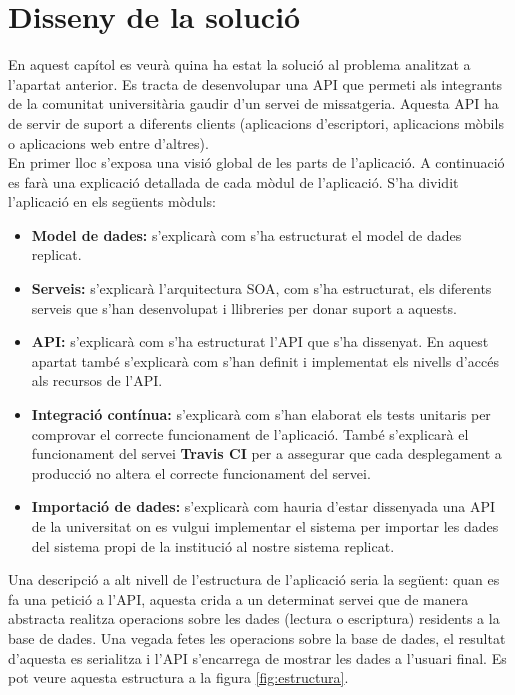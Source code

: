 \chapter{Disseny de la solució}\label{disseny}
En aquest capítol es veurà quina ha estat la solució al problema analitzat a l'apartat anterior. Es tracta de desenvolupar una \ac{API} que permeti als integrants de la comunitat universitària gaudir d'un servei de missatgeria. Aquesta \ac{API} ha de servir de suport a diferents clients (aplicacions d'escriptori, aplicacions mòbils o aplicacions web entre d'altres). \\

En primer lloc s'exposa una visió global de les parts de l'aplicació. A continuació es farà una explicació detallada de cada mòdul de l'aplicació. S'ha dividit l'aplicació en els següents mòduls: 
\begin{itemize}

	\item \textbf{Model de dades:} s'explicarà com s'ha estructurat el model de dades replicat.
	
	\item \textbf{Serveis:} s'explicarà l'arquitectura \ac{SOA}, com s'ha estructurat, els diferents serveis que s'han desenvolupat i llibreries per donar suport a aquests.
	
	\item \textbf{\ac{API}:} s'explicarà com s'ha estructurat l'\ac{API} que s'ha dissenyat. En aquest apartat també s'explicarà com s'han definit i implementat els nivells d'accés als recursos de l'\ac{API}.
	
	\item \textbf{Integració contínua:} s'explicarà com s'han elaborat els tests unitaris per comprovar el correcte funcionament de l'aplicació. També s'explicarà el funcionament del servei \textbf{Travis CI} per a assegurar que cada desplegament a producció no altera el correcte funcionament del servei.
	
	\item \textbf{Importació de dades:} s'explicarà com hauria d'estar dissenyada una \ac{API} de la universitat on es vulgui implementar el sistema per importar les dades del sistema propi de la institució al nostre sistema replicat.
	
\end{itemize}

Una descripció a alt nivell de l'estructura de l'aplicació seria la següent: quan es fa una petició a l'\ac{API}, aquesta crida a un determinat servei que de manera abstracta realitza operacions sobre les dades (lectura o escriptura) residents a la base de dades. Una vegada fetes les operacions sobre la base de dades, el resultat d'aquesta es serialitza i l'\ac{API} s'encarrega de mostrar les dades a l'usuari final. Es pot veure aquesta estructura a la figura \ref{fig:estructura}.

